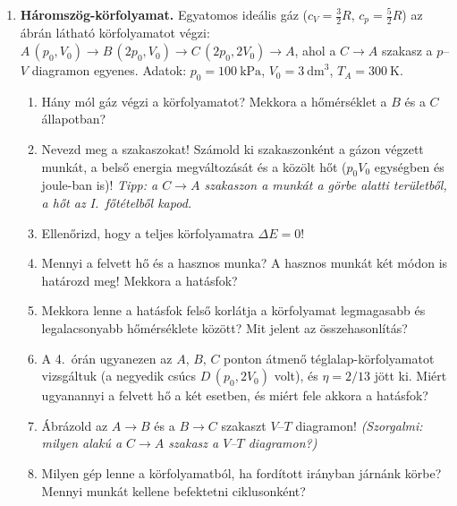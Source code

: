 \documentclass[11pt,a4paper]{article}
\begin{document}
\begin{enumerate}
\item \begin{minipage}[t]{0.66\linewidth}
  \textbf{Háromszög-körfolyamat.} Egyatomos ideális gáz ($c_V = \tfrac32 R$,
  $c_p = \tfrac52 R$) az ábrán látható körfolyamatot végzi:
  $A\,(p_0, V_0) \to B\,(2p_0, V_0) \to C\,(2p_0, 2V_0) \to A$, ahol a $C\to A$ szakasz a
  $p$--$V$ diagramon egyenes. Adatok: $p_0 = 100~\text{kPa}$, $V_0 = 3~\text{dm}^3$,
  $T_A = 300~\text{K}$.
\end{minipage}\hfill
\begin{minipage}[t]{0.30\linewidth}\vspace{0pt}\centering
\end{minipage}
  \begin{enumerate}
    \item Hány mól gáz végzi a körfolyamatot? Mekkora a hőmérséklet a $B$ és a $C$
      állapotban?
    \item Nevezd meg a szakaszokat! Számold ki szakaszonként a gázon végzett munkát, a
      belső energia megváltozását és a közölt hőt ($p_0V_0$ egységben és joule-ban is)!
      \emph{Tipp: a $C\to A$ szakaszon a munkát a görbe alatti területből, a hőt az
      I.~főtételből kapod.}
    \item Ellenőrizd, hogy a teljes körfolyamatra $\Delta E = 0$!
    \item Mennyi a felvett hő és a hasznos munka? A hasznos munkát két módon is határozd
      meg! Mekkora a hatásfok?
    \item Mekkora lenne a hatásfok felső korlátja a körfolyamat legmagasabb és legalacsonyabb
      hőmérséklete között? Mit jelent az összehasonlítás?
    \item A 4.~órán ugyanezen az $A$, $B$, $C$ ponton átmenő téglalap-körfolyamatot
      vizsgáltuk (a negyedik csúcs $D\,(p_0, 2V_0)$ volt), és $\eta = 2/13$ jött ki. Miért
      ugyanannyi a felvett hő a két esetben, és miért fele akkora a hatásfok?
    \item Ábrázold az $A\to B$ és a $B\to C$ szakaszt $V$--$T$ diagramon!
      \emph{(Szorgalmi: milyen alakú a $C\to A$ szakasz a $V$--$T$ diagramon?)}
    \item Milyen gép lenne a körfolyamatból, ha fordított irányban járnánk körbe? Mennyi
      munkát kellene befektetni ciklusonként?
  \end{enumerate}


\end{enumerate}
\end{document}
